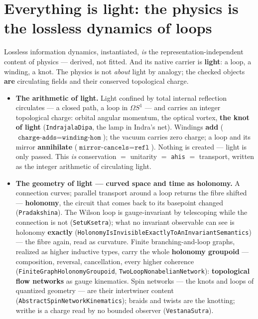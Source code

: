 \documentclass[11pt]{article}
\newcommand{\tm}[1]{\texttt{#1}}
\begin{document}
\section{Everything is light: the physics is the lossless dynamics of loops}

Lossless information dynamics, instantiated, \emph{is} the
representation-independent content of physics --- derived, not fitted. And its
native carrier is \textbf{light}: a loop, a winding, a knot. The physics is not
\emph{about} light by analogy; the checked objects \textbf{are} circulating
fields and their conserved topological charge.

\begin{itemize}
  \item \textbf{The arithmetic of light.} Light confined by total internal
  reflection circulates --- a closed path, a loop in $\Omega S^1$ --- and
  carries an integer topological charge: orbital angular momentum, the optical
  vortex, \textbf{the knot of light} (\tm{IndrajalaDipa}, the lamp in Indra's
  net). Windings \textbf{add} ($\tm{charge-adds} = \tm{winding-hom}$); the
  vacuum carries zero charge; a loop and its mirror \textbf{annihilate}
  ($\tm{mirror-cancels} = \tm{refl}$). Nothing is created --- light is only
  passed. This \emph{is} conservation $=$ unitarity $=$ \tm{ahis} $=$
  transport, written as the integer arithmetic of circulating light.

  \item \textbf{The geometry of light --- curved space and time as holonomy.} A
  connection curves; parallel transport around a loop returns the fibre shifted
  --- \textbf{holonomy}, the circuit that comes back to its basepoint changed
  (\tm{Pradakshina}). The Wilson loop is gauge-invariant by telescoping while
  the connection is not (\tm{SetuKsetra}); what no invariant observable can see
  is holonomy \textbf{exactly} (\tm{HolonomyIsInvisibleExactlyToAnInvariantSemantics})
  --- the fibre again, read as curvature. Finite branching-and-loop graphs,
  realized as higher inductive types, carry the whole \textbf{holonomy
  groupoid} --- composition, reversal, cancellation, every higher coherence
  (\tm{FiniteGraphHolonomyGroupoid}, \tm{TwoLoopNonabelianNetwork}):
  \textbf{topological flow networks} as gauge kinematics. Spin networks --- the
  knots and loops of quantized geometry --- are their intertwiner content
  (\tm{AbstractSpinNetworkKinematics}); braids and twists are the knotting;
  writhe is a charge read by no bounded observer (\tm{VestanaSutra}).


\end{itemize}
\end{document}

